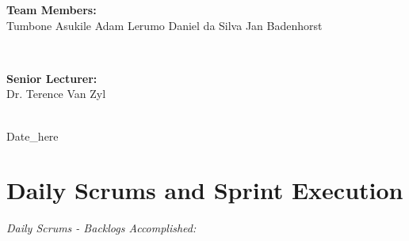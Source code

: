 \documentclass[a4paper]{article}
\begin{document}
\begin{titlepage}
\begin{minipage}{0.4\textwidth}
\begin{flushleft}
\textbf{Team Members:} \\[0.3cm]

Tumbone Asukile\newline
Adam Lerumo\newline
Daniel da Silva\newline
Jan Badenhorst\newline

\end{flushleft}

\end{minipage} \\[0.7cm]

\begin{minipage}{0.4\textwidth}

\begin{flushright} \large

\textbf{Senior Lecturer:} \\[0.3cm]

Dr. Terence Van Zyl

\end{flushright}

\end{minipage} \\[1cm]

{\large Date\_here} 
    
\end{titlepage}

\setlength\parindent{24pt}

\newpage

\section{Daily Scrums and Sprint Execution}

\emph{Daily Scrums - Backlogs Accomplished:}
\end{document}
